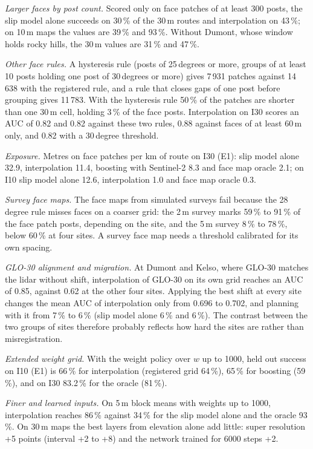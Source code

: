 \documentclass[10pt]{article}
\begin{document}
\textit{Larger faces by post count.} Scored only on face patches of at least 300 posts, the slip model alone succeeds on 30\,\% of the 30\,m routes and interpolation on 43\,\%; on 10\,m maps the values are 39\,\% and 93\,\%. Without Dumont, whose window holds rocky hills, the 30\,m values are 31\,\% and 47\,\%.

\textit{Other face rules.} A hysteresis rule (posts of 25\,degrees or more, groups of at least 10 posts holding one post of 30\,degrees or more) gives 7\,931 patches against 14\,638 with the registered rule, and a rule that closes gaps of one post before grouping gives 11\,783. With the hysteresis rule 50\,\% of the patches are shorter than one 30\,m cell, holding 3\,\% of the face posts. Interpolation on I30 scores an AUC of 0.82 and 0.82 against these two rules, 0.88 against faces of at least 60\,m only, and 0.82 with a 30\,degree threshold.

\textit{Exposure.} Metres on face patches per km of route on I30 (E1): slip model alone 32.9, interpolation 11.4, boosting with Sentinel-2 8.3 and face map oracle 2.1; on I10 slip model alone 12.6, interpolation 1.0 and face map oracle 0.3.

\textit{Survey face maps.} The face maps from simulated surveys fail because the 28\,degree rule misses faces on a coarser grid: the 2\,m survey marks 59\,\% to 91\,\% of the face patch posts, depending on the site, and the 5\,m survey 8\,\% to 78\,\%, below 60\,\% at four sites. A survey face map needs a threshold calibrated for its own spacing.

\textit{GLO-30 alignment and migration.} At Dumont and Kelso, where GLO-30 matches the lidar without shift, interpolation of GLO-30 on its own grid reaches an AUC of 0.85, against 0.62 at the other four sites. Applying the best shift at every site changes the mean AUC of interpolation only from 0.696 to 0.702, and planning with it from 7\,\% to 6\,\% (slip model alone 6\,\% and 6\,\%). The contrast between the two groups of sites therefore probably reflects how hard the sites are rather than misregistration.

\textit{Extended weight grid.} With the weight policy over $w$ up to 1000, held out success on I10 (E1) is 66\,\% for interpolation (registered grid 64\,\%), 65\,\% for boosting (59\,\%), and on I30 83.2\,\% for the oracle (81\,\%).

\textit{Finer and learned inputs.} On 5\,m block means with weights up to 1000, interpolation reaches 86\,\% against 34\,\% for the slip model alone and the oracle 93\,\%. On 30\,m maps the best layers from elevation alone add little: super resolution +5 points (interval +2 to +8) and the network trained for 6000 steps +2.
\end{document}
